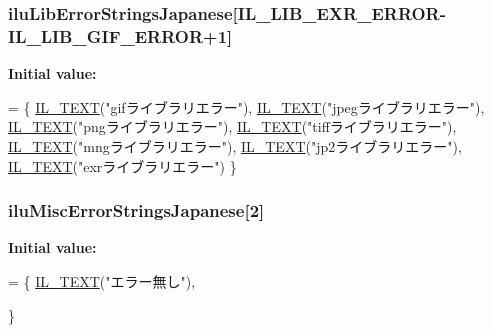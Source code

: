 \hypertarget{ilu__err-japanese_8h_ad0377dc987638bba9e5da85981694986}{
\subsubsection[{ilu\-Lib\-Error\-Strings\-Japanese}]{ ilu\-Lib\-Error\-Strings\-Japanese\mbox{[}{\bf I\-L\-\_\-\-L\-I\-B\-\_\-\-E\-X\-R\-\_\-\-E\-R\-R\-O\-R}-\/{\bf I\-L\-\_\-\-L\-I\-B\-\_\-\-G\-I\-F\-\_\-\-E\-R\-R\-O\-R}+1\mbox{]}}}\label{ilu__err-japanese_8h_ad0377dc987638bba9e5da85981694986}
{\bfseries Initial value\-:}
\begin{DoxyCode}
= \{
    \hyperlink{il_8h_a2907c2129d2ba2ebbae6aa6a69b7f685}{IL\_TEXT}(\textcolor{stringliteral}{"gifライブラリエラー"}), 
    \hyperlink{il_8h_a2907c2129d2ba2ebbae6aa6a69b7f685}{IL\_TEXT}(\textcolor{stringliteral}{"jpegライブラリエラー"}), 
    \hyperlink{il_8h_a2907c2129d2ba2ebbae6aa6a69b7f685}{IL\_TEXT}(\textcolor{stringliteral}{"pngライブラリエラー"}), 
    \hyperlink{il_8h_a2907c2129d2ba2ebbae6aa6a69b7f685}{IL\_TEXT}(\textcolor{stringliteral}{"tiffライブラリエラー"}), 
    \hyperlink{il_8h_a2907c2129d2ba2ebbae6aa6a69b7f685}{IL\_TEXT}(\textcolor{stringliteral}{"mngライブラリエラー"}), 
    \hyperlink{il_8h_a2907c2129d2ba2ebbae6aa6a69b7f685}{IL\_TEXT}(\textcolor{stringliteral}{"jp2ライブラリエラー"}), 
    \hyperlink{il_8h_a2907c2129d2ba2ebbae6aa6a69b7f685}{IL\_TEXT}(\textcolor{stringliteral}{"exrライブラリエラー"}) 
\}
\end{DoxyCode}
\hypertarget{ilu__err-japanese_8h_a66bdaea141bc0db33848117b1152dbf7}{
\subsubsection[{ilu\-Misc\-Error\-Strings\-Japanese}]{ ilu\-Misc\-Error\-Strings\-Japanese\mbox{[}2\mbox{]}}}\label{ilu__err-japanese_8h_a66bdaea141bc0db33848117b1152dbf7}
{\bfseries Initial value\-:}
\begin{DoxyCode}
= \{
    \hyperlink{il_8h_a2907c2129d2ba2ebbae6aa6a69b7f685}{IL\_TEXT}(\textcolor{stringliteral}{"エラー無し"}),

\}
\end{DoxyCode}

